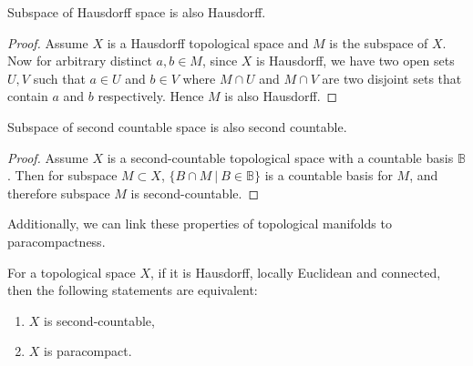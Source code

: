 \documentclass[12pt,twoside]{article}
\begin{document}
\begin{proposition}
Subspace of Hausdorff space is also Hausdorff.
\begin{proof}
Assume $X$ is a Hausdorff topological space and $M$ is the subspace of $X$. Now for arbitrary distinct $a,b\in M$, since $X$ is Hausdorff, we have two open sets $U,V$ such that $a\in U$ and $b\in V$ where $M\cap U$ and $M\cap V$ are two disjoint sets that contain $a$ and $b$ respectively. Hence $M$ is also Hausdorff.
\end{proof}
\end{proposition}
\begin{proposition}
Subspace of second countable space is also second countable.
\begin{proof}
Assume $X$ is a second-countable topological space with a countable basis $\mathbb{B}$. Then for subspace $M\subset X$, $\{B\cap M\ |\ B\in \mathbb{B}\}$ is a countable basis for $M$, and therefore subspace $M$ is second-countable.
\end{proof}
\end{proposition}

Additionally, we can link these properties of topological manifolds to paracompactness.
\begin{theorem}
\label{sec para}
For a topological space $X$, if it is Hausdorff, locally Euclidean and connected, then the following statements are equivalent:\cite{harvard}
\begin{enumerate}
    \item $X$ is second-countable,
    \item $X$ is paracompact.
\end{enumerate}
\end{theorem}
\end{document}
